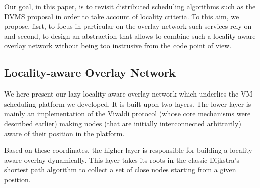 Our goal, in this paper, is to revisit distributed scheduling algorithms such as
the DVMS proposal in order to take account of locality criteria.  To this aim,
we propose, fisrt,  to focus in particular on the overlay network such services rely on and second, to design
an abstraction that allows to combine such a locality-aware overlay network without being too
instrusive from the code point of view. 

\subsection{Locality-aware Overlay Network \label{ssec:lao}}

We here present our lazy locality-aware overlay network which underlies the VM scheduling
platform we developed. It is built upon two layers. The lower layer is mainly an
implementation of the Vivaldi protocol (whose core mechanisms were described earlier)
making nodes (that are initially interconnected arbitrarily) aware of their position in
the platform.

Based on these coordinates, the higher layer is responsible for building a locality-aware
overlay dynamically. This layer takes its roots in the classic Dijkstra's shortest path
algorithm to collect a set of close nodes starting from a given position.







